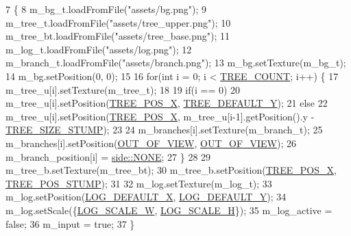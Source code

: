 \begin{DoxyCode}
7                   \{
8     m\_bg\_t.loadFromFile(\textcolor{stringliteral}{"assets/bg.png"});
9     m\_tree\_t.loadFromFile(\textcolor{stringliteral}{"assets/tree\_upper.png"});
10     m\_tree\_bt.loadFromFile(\textcolor{stringliteral}{"assets/tree\_base.png"});
11     m\_log\_t.loadFromFile(\textcolor{stringliteral}{"assets/log.png"});
12     m\_branch\_t.loadFromFile(\textcolor{stringliteral}{"assets/branch.png"});
13     m\_bg.setTexture(m\_bg\_t);
14     m\_bg.setPosition(0, 0);
15     
16     \textcolor{keywordflow}{for}(\textcolor{keywordtype}{int} i = 0; i < \hyperlink{assets_8h_af9e38b40ed77ca3acf11736e89974fb1}{TREE\_COUNT}; i++) \{
17         m\_tree\_u[i].setTexture(m\_tree\_t);
18 
19         \textcolor{keywordflow}{if}(i == 0)
20             m\_tree\_u[i].setPosition(\hyperlink{assets_8h_aea22d742dfd04dbd6c20e35656964db0}{TREE\_POS\_X}, \hyperlink{assets_8h_a3c0fe0f362183318fca02673e8945e82}{TREE\_DEFAULT\_Y});
21         \textcolor{keywordflow}{else}
22             m\_tree\_u[i].setPosition(\hyperlink{assets_8h_aea22d742dfd04dbd6c20e35656964db0}{TREE\_POS\_X}, m\_tree\_u[i-1].getPosition().y - 
      \hyperlink{assets_8h_a702bae0dba0768c3ecaf00f16ac8ce24}{TREE\_SIZE\_STUMP});
23         
24         m\_branches[i].setTexture(m\_branch\_t);
25         m\_branches[i].setPosition(\hyperlink{assets_8h_a42b3027df9eba88a0de54ff48374cd8a}{OUT\_OF\_VIEW}, \hyperlink{assets_8h_a42b3027df9eba88a0de54ff48374cd8a}{OUT\_OF\_VIEW});
26         m\_branch\_position[i] = \hyperlink{assets_8h_afc015eff6557e84151d2e53b94375445ab50339a10e1de285ac99d4c3990b8693}{side::NONE};
27     \}
28     
29     m\_tree\_b.setTexture(m\_tree\_bt);
30     m\_tree\_b.setPosition(\hyperlink{assets_8h_aea22d742dfd04dbd6c20e35656964db0}{TREE\_POS\_X}, \hyperlink{assets_8h_a453c33a710126a75f7c896213cd2042f}{TREE\_POS\_STUMP});
31 
32     m\_log.setTexture(m\_log\_t);
33     m\_log.setPosition(\hyperlink{assets_8h_ae6dc3cb1360c56d5ced03e209c167246}{LOG\_DEFAULT\_X}, \hyperlink{assets_8h_af03867adeb41793ca8058f77fa8fcb23}{LOG\_DEFAULT\_Y});
34     m\_log.setScale(\{\hyperlink{assets_8h_a3dcf3ea8a02f96c3d150bea6904bac8a}{LOG\_SCALE\_W}, \hyperlink{assets_8h_afd62fd237577cea88dcbbed4d47b409d}{LOG\_SCALE\_H}\});
35     m\_log\_active = \textcolor{keyword}{false};
36     m\_input = \textcolor{keyword}{true};
37 \}
\end{DoxyCode}
\mbox{\label{class_assets_a6af3226d6a6960be5260e9edc22cf665}} 
